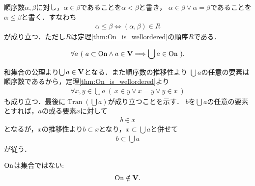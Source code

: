 	順序数$\alpha,\beta$に対し，$\alpha \in \beta$であることを$\alpha < \beta$と書き，
	$\alpha \in \beta \vee \alpha = \beta$であることを$\alpha \leq \beta$と書く．すなわち
	\begin{align}
		\alpha \leq \beta \Longleftrightarrow (\alpha,\beta) \in R
	\end{align}
	が成り立つ．ただし$R$は定理\ref{thm:On_is_wellordered}の順序$R$である．
	
	\begin{screen}
		\begin{thm}
			\begin{align}
				\forall a\ 
				(\ a \subset \ON \wedge a \in \Univ \Longrightarrow \bigcup a \in \ON\ ).
			\end{align}
		\end{thm}
	\end{screen}
	
	\begin{prf}
		和集合の公理より$\bigcup a \in \mathbf{V}$となる．また順序数の推移性より
		$\bigcup a$の任意の要素は順序数であるから，定理\ref{thm:On_is_wellordered}より
		\begin{align}
			\forall x,y \in \bigcup a\ (\ x \in y \vee x = y \vee y \in x\ )
		\end{align}
		も成り立つ．最後に$\operatorname{Tran}(\bigcup a)$が成り立つことを示す．
		$b$を$\bigcup a$の任意の要素とすれば，$a$の或る要素$x$に対して
		\begin{align}
			b \in x
		\end{align}
		となるが，$x$の推移性より$b \subset x$となり，$x \subset \bigcup a$と併せて
		\begin{align}
			b \subset \bigcup a
		\end{align}
		が従う．
		\QED
	\end{prf}
	
	\begin{screen}
		\begin{thm}
			$\mathrm{On}$は集合ではない:
			\begin{align}
				\mathrm{On} \notin \mathbf{V}.
			\end{align}
		\end{thm}
	\end{screen}
	
